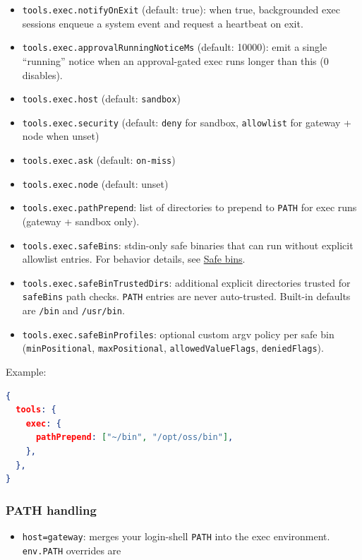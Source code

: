 \begin{itemize}
  \item \texttt{tools.exec.notifyOnExit} (default: true): when true, backgrounded exec sessions enqueue a system event and request a heartbeat on exit.
  \item \texttt{tools.exec.approvalRunningNoticeMs} (default: 10000): emit a single “running” notice when an approval-gated exec runs longer than this (0 disables).
  \item \texttt{tools.exec.host} (default: \texttt{sandbox})
  \item \texttt{tools.exec.security} (default: \texttt{deny} for sandbox, \texttt{allowlist} for gateway + node when unset)
  \item \texttt{tools.exec.ask} (default: \texttt{on-miss})
  \item \texttt{tools.exec.node} (default: unset)
  \item \texttt{tools.exec.pathPrepend}: list of directories to prepend to \texttt{PATH} for exec runs (gateway + sandbox only).
  \item \texttt{tools.exec.safeBins}: stdin-only safe binaries that can run without explicit allowlist entries. For behavior details, see \href{/tools/exec-approvals\#safe-bins-stdin-only}{Safe bins}.
  \item \texttt{tools.exec.safeBinTrustedDirs}: additional explicit directories trusted for \texttt{safeBins} path checks. \texttt{PATH} entries are never auto-trusted. Built-in defaults are \texttt{/bin} and \texttt{/usr/bin}.
  \item \texttt{tools.exec.safeBinProfiles}: optional custom argv policy per safe bin (\texttt{minPositional}, \texttt{maxPositional}, \texttt{allowedValueFlags}, \texttt{deniedFlags}).
\end{itemize}


Example:

\begin{lstlisting}[language=json]
{
  tools: {
    exec: {
      pathPrepend: ["~/bin", "/opt/oss/bin"],
    },
  },
}
\end{lstlisting}


\subsubsection{PATH handling}


\begin{itemize}
  \item \texttt{host=gateway}: merges your login-shell \texttt{PATH} into the exec environment. \texttt{env.PATH} overrides are
\end{itemize}


